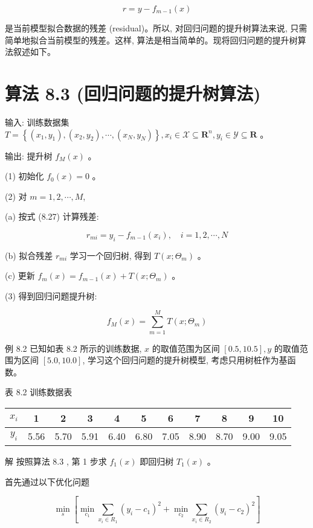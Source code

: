 \documentclass[10pt]{article}
\begin{document}
\begin{equation*}
r=y-f_{m-1}(x) \tag{8.28}
\end{equation*}


是当前模型拟合数据的残差 (residual)。所以, 对回归问题的提升树算法来说, 只需简单地拟合当前模型的残差。这样, 算法是相当简单的。现将回归问题的提升树算法叙述如下。

\section*{算法 8.3 (回归问题的提升树算法)}
输入: 训练数据集 $T=\left\{\left(x_{1}, y_{1}\right),\left(x_{2}, y_{2}\right), \cdots,\left(x_{N}, y_{N}\right)\right\}, x_{i} \in \mathcal{X} \subseteq \boldsymbol{R}^{n}, y_{i} \in \mathcal{Y} \subseteq \boldsymbol{R}$ 。

输出: 提升树 $f_{M}(x)$ 。

(1) 初始化 $f_{0}(x)=0$ 。

(2) 对 $m=1,2, \cdots, M$,

(a) 按式 (8.27) 计算残差:

$$
r_{m i}=y_{i}-f_{m-1}\left(x_{i}\right), \quad i=1,2, \cdots, N
$$

(b) 拟合残差 $r_{m i}$ 学习一个回归树, 得到 $T\left(x ; \Theta_{m}\right)$ 。

(c) 更新 $f_{m}(x)=f_{m-1}(x)+T\left(x ; \Theta_{m}\right)$ 。

(3) 得到回归问题提升树:

$$
f_{M}(x)=\sum_{m=1}^{M} T\left(x ; \Theta_{m}\right)
$$

例 8.2 已知如表 8.2 所示的训练数据, $x$ 的取值范围为区间 $[0.5,10.5], y$ 的取值范围为区间 $[5.0,10.0]$, 学习这个回归问题的提升树模型, 考虑只用树桩作为基函数。

表 8.2 训练数据表

\begin{center}
\begin{tabular}{ccccccccccc}
\hline
$x_{i}$ & 1 & 2 & 3 & 4 & 5 & 6 & 7 & 8 & 9 & 10 \\
\hline
$y_{i}$ & 5.56 & 5.70 & 5.91 & 6.40 & 6.80 & 7.05 & 8.90 & 8.70 & 9.00 & 9.05 \\
\hline\hline
\end{tabular}
\end{center}

解 按照算法 8.3 , 第 1 步求 $f_{1}(x)$ 即回归树 $T_{1}(x)$ 。

首先通过以下优化问题

$$
\min _{s}\left[\min _{c_{1}} \sum_{x_{i} \in R_{1}}\left(y_{i}-c_{1}\right)^{2}+\min _{c_{2}} \sum_{x_{i} \in R_{2}}\left(y_{i}-c_{2}\right)^{2}\right]
$$
\end{document}
